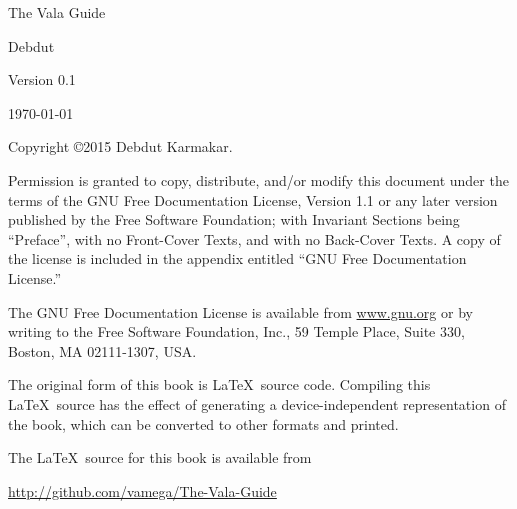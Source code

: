 \documentclass[openany]{book}
\begin{document}
\pagebreak
\thispagestyle{empty}

\begin{flushright}
\vspace*{2.5in}

{\huge The Vala Guide}

\vspace{1in}

{\Large
Debdut
}


\vspace{1in}

{\Large Version 0.1}

{\small \today}

\vfill

\end{flushright}

\pagebreak
\thispagestyle{empty}

Copyright \copyright 2015 Debdut Karmakar.

\vspace{0.25in}

Permission is granted to copy, distribute, and/or modify this document
under the terms of the GNU Free Documentation License, Version 1.1 or
any later version published by the Free Software Foundation; with
Invariant Sections being ``Preface'', with no Front-Cover Texts, and
with no Back-Cover Texts.  A copy of the license is included in the
appendix entitled ``GNU Free Documentation License.''

The GNU Free Documentation License is available from \url{www.gnu.org}
or by writing to the Free Software Foundation, Inc., 59 Temple Place,
Suite 330, Boston, MA 02111-1307, USA.

The original form of this book is \LaTeX\ source code.  Compiling this
\LaTeX\ source has the effect of generating a device-independent
representation of the book, which can be converted to other formats
and printed.

The \LaTeX\ source for this book is available from

\hspace{0.25in}\url{http://github.com/vamega/The-Vala-Guide}

\vspace{0.25in}

\fontsize{12pt}{18pt}\selectfont
\tableofcontents



\end{document}
